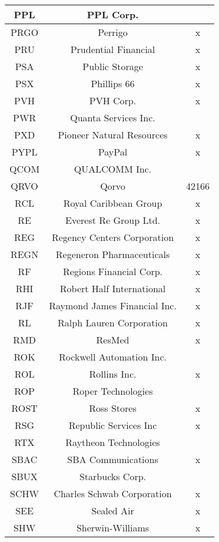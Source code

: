 \documentclass[11pt]{article}
\begin{document}
\begin{onehalfspace}
\begin{longtable}[h!]{|c|c|c|}
        PPL & PPL Corp. &  \\ \hline
        PRGO & Perrigo & x \\ \hline
        PRU & Prudential Financial & x \\ \hline
        PSA & Public Storage & x \\ \hline
        PSX & Phillips 66 & x \\ \hline
        PVH & PVH Corp. & x \\ \hline
        PWR & Quanta Services Inc. &  \\ \hline
        PXD & Pioneer Natural Resources & x \\ \hline
        PYPL & PayPal & x \\ \hline
        QCOM & QUALCOMM Inc. &  \\ \hline
        QRVO & Qorvo & 42166 \\ \hline
        RCL & Royal Caribbean Group & x \\ \hline
        RE & Everest Re Group Ltd. & x \\ \hline
        REG & Regency Centers Corporation & x \\ \hline
        REGN & Regeneron Pharmaceuticals & x \\ \hline
        RF & Regions Financial Corp. & x \\ \hline
        RHI & Robert Half International & x \\ \hline
        RJF & Raymond James Financial Inc. & x \\ \hline
        RL & Ralph Lauren Corporation & x \\ \hline
        RMD & ResMed & x \\ \hline
        ROK & Rockwell Automation Inc. &  \\ \hline
        ROL & Rollins Inc. & x \\ \hline
        ROP & Roper Technologies &  \\ \hline
        ROST & Ross Stores & x \\ \hline
        RSG & Republic Services Inc & x \\ \hline
        RTX & Raytheon Technologies &  \\ \hline
        SBAC & SBA Communications & x \\ \hline
        SBUX & Starbucks Corp. &  \\ \hline
        SCHW & Charles Schwab Corporation & x \\ \hline
        SEE & Sealed Air & x \\ \hline
        SHW & Sherwin-Williams & x \\ \hline

\end{longtable}
\end{onehalfspace}
\end{document}
